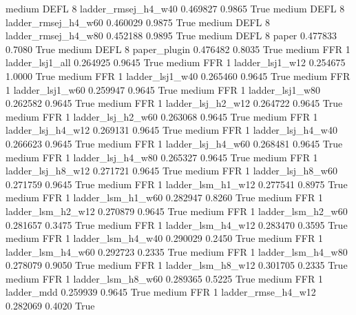     medium     DEFL                 8 ladder_rmsej_h4_w40   0.469827      0.9865    True
    medium     DEFL                 8 ladder_rmsej_h4_w60   0.460029      0.9875    True
    medium     DEFL                 8 ladder_rmsej_h4_w80   0.452188      0.9895    True
    medium     DEFL                 8               paper   0.477833      0.7080    True
    medium     DEFL                 8        paper_plugin   0.476482      0.8035    True
    medium      FFR                 1     ladder_lsj1_all   0.264925      0.9645    True
    medium      FFR                 1     ladder_lsj1_w12   0.254675      1.0000    True
    medium      FFR                 1     ladder_lsj1_w40   0.265460      0.9645    True
    medium      FFR                 1     ladder_lsj1_w60   0.259947      0.9645    True
    medium      FFR                 1     ladder_lsj1_w80   0.262582      0.9645    True
    medium      FFR                 1   ladder_lsj_h2_w12   0.264722      0.9645    True
    medium      FFR                 1   ladder_lsj_h2_w60   0.263068      0.9645    True
    medium      FFR                 1   ladder_lsj_h4_w12   0.269131      0.9645    True
    medium      FFR                 1   ladder_lsj_h4_w40   0.266623      0.9645    True
    medium      FFR                 1   ladder_lsj_h4_w60   0.268481      0.9645    True
    medium      FFR                 1   ladder_lsj_h4_w80   0.265327      0.9645    True
    medium      FFR                 1   ladder_lsj_h8_w12   0.271721      0.9645    True
    medium      FFR                 1   ladder_lsj_h8_w60   0.271759      0.9645    True
    medium      FFR                 1   ladder_lsm_h1_w12   0.277541      0.8975    True
    medium      FFR                 1   ladder_lsm_h1_w60   0.282947      0.8260    True
    medium      FFR                 1   ladder_lsm_h2_w12   0.270879      0.9645    True
    medium      FFR                 1   ladder_lsm_h2_w60   0.281657      0.3475    True
    medium      FFR                 1   ladder_lsm_h4_w12   0.283470      0.3595    True
    medium      FFR                 1   ladder_lsm_h4_w40   0.290029      0.2450    True
    medium      FFR                 1   ladder_lsm_h4_w60   0.292723      0.2335    True
    medium      FFR                 1   ladder_lsm_h4_w80   0.278079      0.9050    True
    medium      FFR                 1   ladder_lsm_h8_w12   0.301705      0.2335    True
    medium      FFR                 1   ladder_lsm_h8_w60   0.289365      0.5225    True
    medium      FFR                 1          ladder_mdd   0.259939      0.9645    True
    medium      FFR                 1  ladder_rmse_h4_w12   0.282069      0.4020    True
